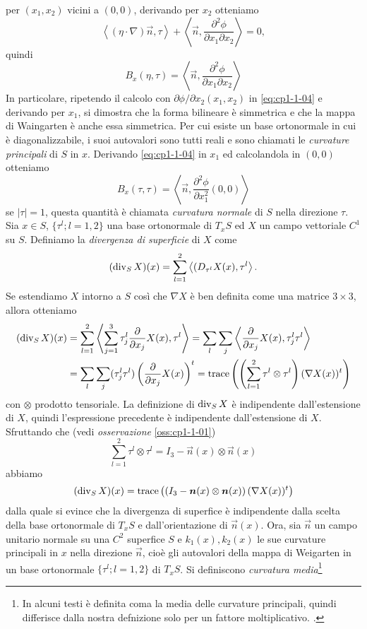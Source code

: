 per $(x_1,x_2)$ vicini a $(0,0)$, derivando per $x_2$  otteniamo
\[
\left<(\eta\cdot\nabla)\vec{n},\tau\right>+\left<\vec{n},\frac{\partial^2\phi}{\partial x_1\partial x_2}\right> = 0,
\]
quindi
\[
B_x(\eta,\tau)=\left<\vec{n},\frac{\partial^2\phi}{\partial x_1\partial x_2}\right>
\]
In particolare, ripetendo il calcolo con $\partial\phi/\partial x_2(x_1,x_2)$ in \eqref{eq:cp1-1-04} e derivando per $x_1$, si dimostra che la forma bilineare è simmetrica e che la mappa di Waingarten è anche essa simmetrica. Per cui esiste un base ortonormale in cui è diagonalizzabile, i suoi autovalori sono tutti reali e sono chiamati le \emph{curvature principali} di $S$ in $x$. Derivando \eqref{eq:cp1-1-04} in $x_1$ ed calcolandola in $(0,0)$ otteniamo
\[
B_x(\tau,\tau)=\left<\vec{n},\frac{\partial^2\phi}{\partial x_1^2}(0,0)\right>
\]
se $|\tau|=1$, questa quantità è chiamata \emph{curvatura normale} di $S$ nella direzione $\tau$. Sia $x\in S$, $\{\tau^l;l=1,2\}$ una base ortonormale di $T_xS$ ed  $X$ un campo vettoriale $C^1$ su $S$. Definiamo la \emph{divergenza di superficie} di $X$ come
\[
(\operatorname{div}_S X)(x) = \sum_{l=1}^2\left<(D_{\tau^l}X(x),\tau^l\right>.
\]
Se estendiamo $X$ intorno a $S$ così che $\nabla X$ è ben definita come una matrice $3\times 3$, allora otteniamo
\[
\begin{aligned}
(\operatorname{div}_S X)(x)&=\sum_{l=1}^2\left<\sum_{j=1}^3\tau_j^l\frac{\partial}{\partial x_j}X(x),\tau^l\right> =\sum_{l}\sum_{j}\left<\frac{\partial}{\partial x_j}X(x),\tau_j^l\tau^l\right> \\
&=\sum_{l}\sum_{j}(\tau_j^l\tau^l)\left(\frac{\partial}{\partial x_j}X(x)\right)^t=\operatorname{trace}\left(\left(\sum_{l=1}^2\tau^l\otimes\tau^l\right) (\nabla X(x))^t\right)
\end{aligned}
\]
con $\otimes$ prodotto tensoriale. La definizione di $\operatorname{div}_S X$ è indipendente dall'estensione di $X$, quindi l'espressione precedente è indipendente dall'estensione di $X$. Sfruttando che (vedi \emph{osservazione} \ref{oss:cp1-1-01})
\begin{equation}
\label{eq:cp1-1-05}
\sum_{l=1}^2\tau^l\otimes\tau^l = I_3 - \vec{n}(x)\otimes\vec{n}(x)
\end{equation}
abbiamo
\begin{equation}
(\operatorname{div}_S X)(x)=\operatorname{trace}\left(\left(I_3 - \bm{n}(x)\otimes\bm{n}(x)\right) (\nabla X(x))^t\right)
\end{equation}
dalla quale si evince che la divergenza di superfice è indipendente dalla scelta della base ortonormale di $T_xS$ e dall'orientazione di $\vec{n}(x)$.
Ora, sia $\vec{n}$ un campo unitario normale su una $C^2$ superfice $S$ e $k_1(x),k_2(x)$ le sue curvature principali in $x$ nella direzione $\vec{n}$, cioè gli autovalori della mappa di Weigarten in un base ortonormale $\{\tau^l;l=1,2\}$ di $T_xS$. Si definiscono \emph{curvatura media}\footnote{In alcuni testi è definita coma la media delle curvature principali, quindi differisce dalla nostra defnizione solo per un fattore moltiplicativo. \cite[vedi][cp 1.3]{giga:main}.} \,%
